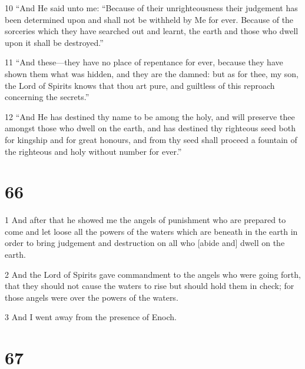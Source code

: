 \par 10 “And He said unto me: “Because of their unrighteousness their judgement has been determined upon and shall not be withheld by Me for ever. Because of the sorceries which they have searched out and learnt, the earth and those who dwell upon it shall be destroyed.”
\par 11 “And these—they have no place of repentance for ever, because they have shown them what was hidden, and they are the damned: but as for thee, my son, the Lord of Spirits knows that thou art pure, and guiltless of this reproach concerning the secrets.”
\par 12 “And He has destined thy name to be among the holy, and will preserve thee amongst those who dwell on the earth, and has destined thy righteous seed both for kingship and for great honours, and from thy seed shall proceed a fountain of the righteous and holy without number for ever.”

\chapter{66}

\par 1 And after that he showed me the angels of punishment who are prepared to come and let loose all the powers of the waters which are beneath in the earth in order to bring judgement and destruction on all who [abide and] dwell on the earth.
\par 2 And the Lord of Spirits gave commandment to the angels who were going forth, that they should not cause the waters to rise but should hold them in check; for those angels were over the powers of the waters.
\par 3 And I went away from the presence of Enoch.

\chapter{67}

